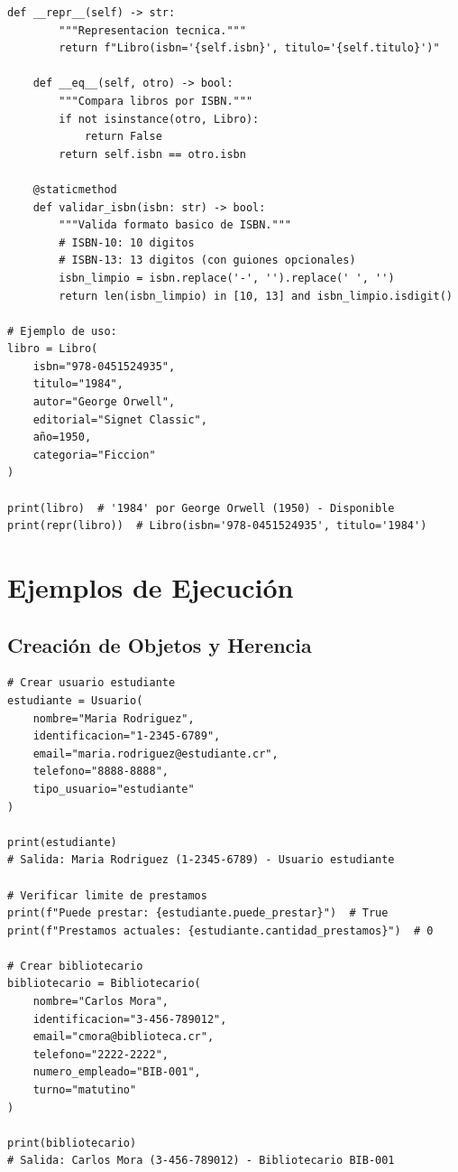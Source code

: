 \documentclass[11pt,letterpaper]{article}
\begin{document}
\begin{lstlisting}[caption={Ejemplo: Clase Libro completa}]
    def __repr__(self) -> str:
        """Representacion tecnica."""
        return f"Libro(isbn='{self.isbn}', titulo='{self.titulo}')"
    
    def __eq__(self, otro) -> bool:
        """Compara libros por ISBN."""
        if not isinstance(otro, Libro):
            return False
        return self.isbn == otro.isbn
    
    @staticmethod
    def validar_isbn(isbn: str) -> bool:
        """Valida formato basico de ISBN."""
        # ISBN-10: 10 digitos
        # ISBN-13: 13 digitos (con guiones opcionales)
        isbn_limpio = isbn.replace('-', '').replace(' ', '')
        return len(isbn_limpio) in [10, 13] and isbn_limpio.isdigit()

# Ejemplo de uso:
libro = Libro(
    isbn="978-0451524935",
    titulo="1984",
    autor="George Orwell",
    editorial="Signet Classic",
    año=1950,
    categoria="Ficcion"
)

print(libro)  # '1984' por George Orwell (1950) - Disponible
print(repr(libro))  # Libro(isbn='978-0451524935', titulo='1984')
\end{lstlisting}

\section{Ejemplos de Ejecución}

\subsection{Creación de Objetos y Herencia}

\begin{lstlisting}[caption={Ejemplo de creación de usuarios y bibliotecarios}]
# Crear usuario estudiante
estudiante = Usuario(
    nombre="Maria Rodriguez",
    identificacion="1-2345-6789",
    email="maria.rodriguez@estudiante.cr",
    telefono="8888-8888",
    tipo_usuario="estudiante"
)

print(estudiante)
# Salida: Maria Rodriguez (1-2345-6789) - Usuario estudiante

# Verificar limite de prestamos
print(f"Puede prestar: {estudiante.puede_prestar}")  # True
print(f"Prestamos actuales: {estudiante.cantidad_prestamos}")  # 0

# Crear bibliotecario
bibliotecario = Bibliotecario(
    nombre="Carlos Mora",
    identificacion="3-456-789012",
    email="cmora@biblioteca.cr",
    telefono="2222-2222",
    numero_empleado="BIB-001",
    turno="matutino"
)

print(bibliotecario)
# Salida: Carlos Mora (3-456-789012) - Bibliotecario BIB-001
\end{lstlisting}
\end{document}
